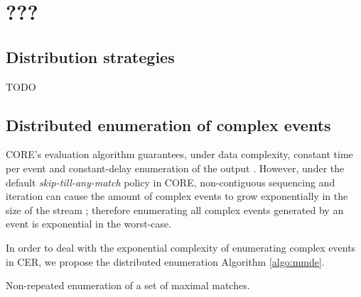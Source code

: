 \chapter{???}\label{chapter:???}


\section{Distribution strategies}\label{sec:distribution_strategies}

TODO


\section{Distributed enumeration of complex events}
\label{sec:distributed_enumeration_of_the_complex_events}

CORE's evaluation algorithm guarantees, under data complexity, constant time per event and constant-delay enumeration of the output \cite{core}. However, under the default \textit{skip-till-any-match} \cite{skip-till-any-match} policy in CORE, non-contiguous sequencing and iteration can cause the amount of complex events to grow exponentially in the size of the stream \cite{formal-framework-cer}; therefore enumerating all complex events generated by an event is exponential in the worst-case.

In order to deal with the exponential complexity of enumerating complex events in CER, we propose the distributed enumeration Algorithm \ref{algo:mmde}.

\begin{algorithm}[H]
  \DontPrintSemicolon
  \SetAlgoNoEnd %
  \SetAlgoNoLine %
  \LinesNumbered

  \;
\caption{Non-repeated enumeration of a set of maximal matches.}
\label{algo:mmde}
\end{algorithm}

